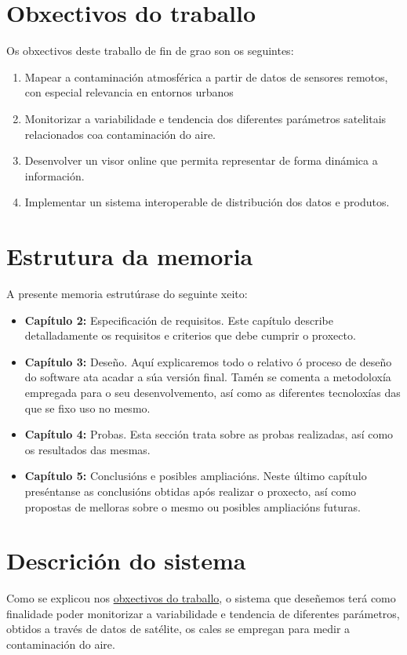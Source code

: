 \section{Obxectivos do traballo}\label{obxectivos}
Os obxectivos deste traballo de fin de grao son os seguintes:
\begin{enumerate}
    \item Mapear a contaminación atmosférica a partir de datos de sensores remotos, con especial relevancia en entornos urbanos
    \item Monitorizar a variabilidade e tendencia dos diferentes parámetros satelitais relacionados coa contaminación do aire.
    \item Desenvolver un visor online que permita representar de forma dinámica a información.
    \item Implementar un sistema interoperable de distribución dos datos e produtos.
\end{enumerate}

\section{Estrutura da memoria}\label{estrutura}
A presente memoria estrutúrase do seguinte xeito:
\begin{itemize}
    \item \textbf{Capítulo 2:} Especificación de requisitos. Este capítulo describe detalladamente os requisitos e criterios que debe cumprir o proxecto.
    \item \textbf{Capítulo 3:} Deseño. Aquí explicaremos todo o relativo ó proceso de deseño do software ata acadar a súa versión final. Tamén se comenta a
    metodoloxía empregada para o seu desenvolvemento, así como as diferentes tecnoloxías das que se fixo uso no mesmo.
    \item \textbf{Capítulo 4:} Probas. Esta sección trata sobre as probas realizadas, así como os resultados das mesmas.
    \item \textbf{Capítulo 5:} Conclusións e posibles ampliacións. Neste último capítulo preséntanse as conclusións obtidas após realizar o proxecto,
    así como propostas de melloras sobre o mesmo ou posibles ampliacións futuras.
\end{itemize}

\section{Descrición do sistema}\label{descricion}
Como se explicou nos \hyperref[sec:obxectivos]{obxectivos do traballo}, o sistema que deseñemos terá como finalidade poder monitorizar a variabilidade e tendencia
de diferentes parámetros, obtidos a través de datos de satélite, os cales se empregan para medir a contaminación do aire.

